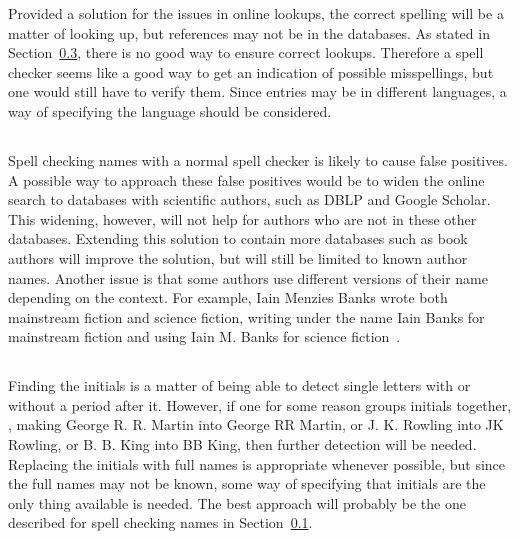 Provided a solution for the issues in online lookups, the correct
spelling will be a matter of looking up, but references may not be in
the databases.  As stated in Section~\ref{sec:approach_look_ups},
there is no good way to ensure correct lookups.  Therefore a spell
checker seems like a good way to get an indication of possible
misspellings, but one would still have to verify them.  Since entries
may be in different languages, a way of specifying the language should
be considered.


\subsection{}
\label{sec:approach_spelling_names}

Spell checking names with a normal spell checker is likely to cause
false positives.  A possible way to approach these false positives
would be to widen the online search to databases with scientific
authors, such as DBLP and Google Scholar.  This widening, however,
will not help for authors who are not in these other databases.
Extending this solution to contain more databases such as book authors
will improve the solution, but will still be limited to known author
names.  Another issue is that some authors use different versions of
their name depending on the context.  For example, Iain Menzies Banks
wrote both mainstream fiction and science fiction, writing under the
name Iain Banks for mainstream fiction and using Iain M. Banks for
science fiction~\cite{community2016_banks}.


\subsection{}

Finding the initials is a matter of being able to detect single
letters with or without a period after it.  However, if one for some
reason groups initials together, \eg, making George R. R. Martin into
George RR Martin, or J. K. Rowling into JK Rowling, or B. B. King into
BB King, then further detection will be needed.  Replacing the
initials with full names is appropriate whenever possible, but since
the full names may not be known, some way of specifying that initials
are the only thing available is needed.  The best approach will
probably be the one described for spell checking names in
Section~\ref{sec:approach_spelling_names}.


\subsection{}
\label{sec:approach_look_ups}

